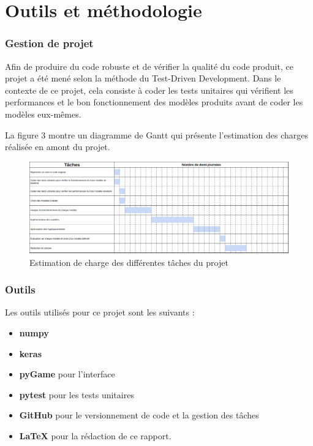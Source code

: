 \documentclass[french]{article}
\begin{document}
    \section{Outils et méthodologie}
    \subsubsection{Gestion de projet}

    Afin de produire du code robuste et de vérifier la qualité du code produit, ce projet a été mené selon la méthode du Test-Driven Development. Dans le contexte de ce projet, cela consiste à coder les tests unitaires qui vérifient les performances et le bon fonctionnement des modèles produits avant de coder les modèles eux-mêmes.
    
    La figure 3 montre un diagramme de Gantt qui présente l'estimation des charges réalisée en amont du projet.

    \begin{figure}[h]
        \includegraphics[width=13cm]{gantt}
        \centering
        \caption{Estimation de charge des différentes tâches du projet}
        \centering
    \end{figure}

    \subsubsection{Outils}

    Les outils utilisés pour ce projet sont les suivants :
    \begin{itemize}
        \item \textbf{numpy}
        \item \textbf{keras}
        \item \textbf{pyGame} pour l'interface
        \item \textbf{pytest} pour les tests unitaires
        \item \textbf{GitHub} pour le versionnement de code et la gestion des tâches
        \item \textbf{\LaTeX} pour la rédaction de ce rapport.
    \end{itemize}
\end{document}
